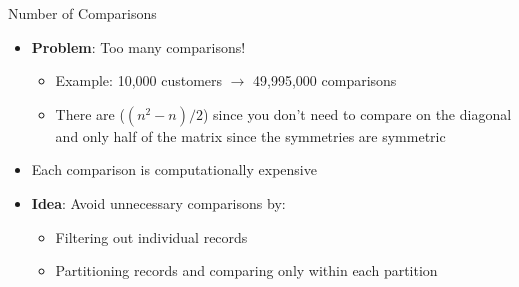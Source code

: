 \documentclass[aspectratio=169]{../latex_main/tntbeamer}  %
\begin{document}
\begin{frame}[c]{Number of Comparisons}

\begin{itemize}
    \item \textbf{Problem}: Too many comparisons!
    \begin{itemize}
        \item Example: 10,000 customers $\rightarrow$ 49,995,000 comparisons 
        \item There are ($(n^2 -n) /2 $) since you don't need to compare on the diagonal and only half of the matrix since the symmetries are symmetric
    \end{itemize}
    \item Each comparison is computationally expensive
    \item \textbf{Idea}: Avoid unnecessary comparisons by:
    \begin{itemize}
        \item Filtering out individual records
        \item Partitioning records and comparing only within each partition
    \end{itemize}
\end{itemize}

\end{frame}
\end{document}

